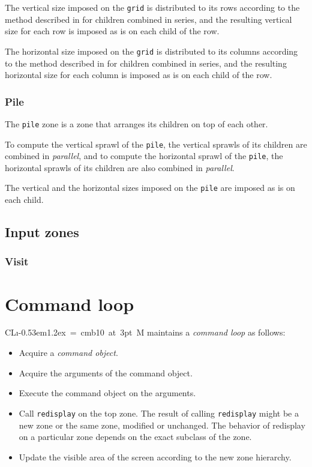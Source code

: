 \documentclass{report}
\def\Tiny{ \font\Tinyfont = cmb10 at 3pt \relax  \Tinyfont}
\def\clim{\textsf{CL{\i}\kern-0.53em\raise1.2ex\hbox{\Tiny 3}M}}
\def\code#1{\texttt{#1}}
\begin{document}
The vertical size imposed on the \code{grid} is distributed to its
rows according to the method described in
 for children combined in
series, and the resulting vertical size for each row is imposed as is
on each child of the row.

The horizontal size imposed on the \code{grid} is distributed to its
columns according to the method described in
 for children combined in
series, and the resulting horizontal size for each column is imposed
as is on each child of the row.

\subsection{Pile}
\label{sec-zones-layout-pile}

The \code{pile} zone is a zone that arranges its children on top of
each other.

To compute the vertical sprawl of the \code{pile}, the vertical
sprawls of its children are combined in \emph{parallel}, and to
compute the horizontal sprawl of the \code{pile}, the horizontal
sprawls of its children are also combined in \emph{parallel}. 


The vertical and the horizontal sizes imposed on the \code{pile}
are imposed as is on each child.

\section{Input zones}
\label{sec-zones-input}

\subsection{Visit}
\label{sec-zones-input-visit}

\chapter{Command loop}

\clim{} maintains a \emph{command loop} as follows:

\begin{itemize}
\item Acquire a \emph{command object}.
\item Acquire the arguments of the command object.
\item Execute the command object on the arguments.
\item Call \code{redisplay} on the top zone.  The result of calling
  \code{redisplay} might be a new zone or the same zone, modified
  or unchanged.  The behavior of redisplay on a particular zone
  depends on the exact subclass of the zone.
\item Update the visible area of the screen according to the new
  zone hierarchy.
\end{itemize}
\end{document}
